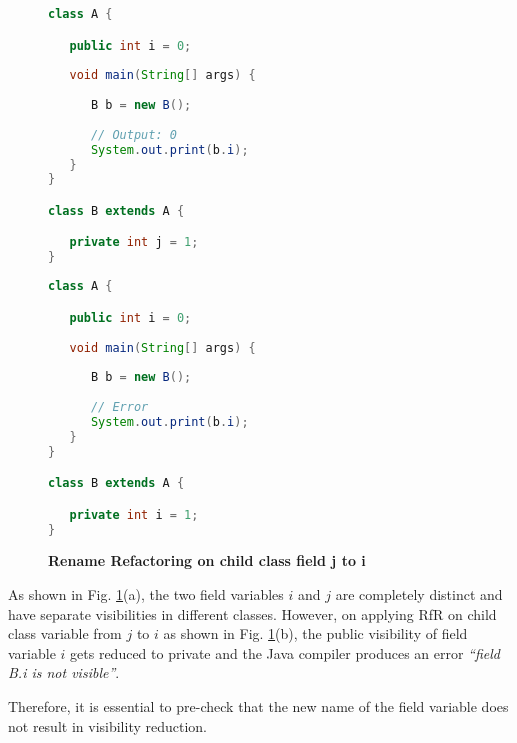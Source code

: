 \begin{figure}[th]
\centering
\begin{minipage}[t]{0.47\linewidth}
\begin{lstlisting}[language=java, basicstyle=\scriptsize\ttfamily,frame=single]
class A {

   public int i = 0;
	
   void main(String[] args) {
	
      B b = new B();
      
      // Output: 0
      System.out.print(b.i); 
   }
}

class B extends A {

   private int j = 1;
}
\end{lstlisting}
\end{minipage}
\hfill
\begin{minipage}[t]{0.47\linewidth}
\begin{lstlisting}[language=java, basicstyle=\scriptsize\ttfamily,frame=single]
class A {

   public int i = 0;
	
   void main(String[] args) {
	
      B b = new B();
      
      // Error
      System.out.print(b.i); 
   }
}

class B extends A {

   private int i = 1;
}
\end{lstlisting}
\end{minipage}
\caption{\textbf{Rename Refactoring on child class field j to i}}
\label{figure:jtoi}
\end{figure}


As shown in Fig. \ref{figure:jtoi}(a), the two field variables $i$ and $j$ are completely distinct and have separate visibilities in different classes. However, on applying RfR on child class variable from $j$ to $i$ as shown in Fig. \ref{figure:jtoi}(b), the public visibility of field variable $i$ gets reduced to private and the Java compiler produces an error \textit{``field B.i is not visible''}. 

Therefore, it is essential to pre-check that the new name of the field variable does not result in visibility reduction. 